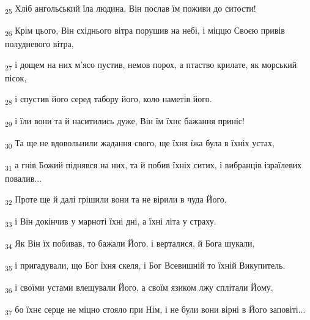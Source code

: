 \begin{tcolorbox}
\textsubscript{25} Хліб ангольський їла людина, Він послав їм поживи до ситости!
\end{tcolorbox}
\begin{tcolorbox}
\textsubscript{26} Крім цього, Він східнього вітра порушив на небі, і міццю Своєю привів полудневого вітра,
\end{tcolorbox}
\begin{tcolorbox}
\textsubscript{27} і дощем на них м'ясо пустив, немов порох, а птаство крилате, як морський пісок,
\end{tcolorbox}
\begin{tcolorbox}
\textsubscript{28} і спустив його серед табору його, коло наметів його.
\end{tcolorbox}
\begin{tcolorbox}
\textsubscript{29} і їли вони та й наситились дуже, Він їм їхнє бажання приніс!
\end{tcolorbox}
\begin{tcolorbox}
\textsubscript{30} Та ще не вдовольнили жадання свого, ще їхня їжа була в їхніх устах,
\end{tcolorbox}
\begin{tcolorbox}
\textsubscript{31} а гнів Божий піднявся на них, та й побив їхніх ситих, і вибранців ізраїлевих повалив...
\end{tcolorbox}
\begin{tcolorbox}
\textsubscript{32} Проте ще й далі грішили вони та не вірили в чуда Його,
\end{tcolorbox}
\begin{tcolorbox}
\textsubscript{33} і Він докінчив у марноті їхні дні, а їхні літа у страху.
\end{tcolorbox}
\begin{tcolorbox}
\textsubscript{34} Як Він їх побивав, то бажали Його, і верталися, й Бога шукали,
\end{tcolorbox}
\begin{tcolorbox}
\textsubscript{35} і пригадували, що Бог їхня скеля, і Бог Всевишній то їхній Викупитель.
\end{tcolorbox}
\begin{tcolorbox}
\textsubscript{36} і своїми устами влещували Його, а своїм язиком лжу сплітали Йому,
\end{tcolorbox}
\begin{tcolorbox}
\textsubscript{37} бо їхнє серце не міцно стояло при Нім, і не були вони вірні в Його заповіті...
\end{tcolorbox}
